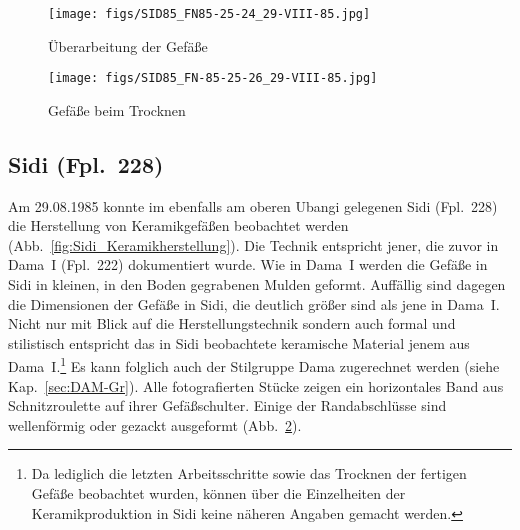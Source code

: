\begin{figure*}[tb]
	\centering
	\begin{subfigure}{0.49\textwidth} %
		\centering
		\texttt{[image: figs/SID85\_FN85-25-24\_29-VIII-85.jpg]}
		\caption{Überarbeitung der Gefäße}
		\label{fig:Sidi_KeramikherstellungA}
	\end{subfigure}
	\begin{subfigure}{0.49\textwidth} %
		\centering
		\texttt{[image: figs/SID85\_FN-85-25-26\_29-VIII-85.jpg]}
		\caption{Gefäße beim Trocknen}
		\label{fig:Sidi_KeramikherstellungB}
	\end{subfigure}
	\caption{Sidi (Fpl.~228): rezente Keramikproduktion (Fotos: F.~Nikulka).}
	\label{fig:Sidi_Keramikherstellung}
\end{figure*}

\subsection*{Sidi (Fpl.~228)}

Am 29.08.1985 konnte im ebenfalls am oberen Ubangi gelegenen Sidi (Fpl.~228) die Herstellung von Keramikgefäßen beobachtet werden (Abb.~\ref{fig:Sidi_Keramikherstellung}). Die Technik entspricht jener, die zuvor in Dama~I (Fpl.~222) dokumentiert wurde. Wie in Dama~I werden die Gefäße in Sidi in kleinen, in den Boden gegrabenen Mulden geformt. Auffällig sind dagegen die Dimensionen der Gefäße in Sidi, die deutlich größer sind als jene in Dama~I. Nicht nur mit Blick auf die Herstellungstechnik sondern auch formal und stilistisch entspricht das in Sidi beobachtete keramische Material jenem aus Dama~I.\footnote{Da lediglich die letzten Arbeitsschritte sowie das Trocknen der fertigen Gefäße beobachtet wurden, können über die Einzelheiten der Keramikproduktion in Sidi keine näheren Angaben gemacht werden.} Es kann folglich auch der Stilgruppe Dama zugerechnet werden (siehe Kap.~\ref{sec:DAM-Gr}). Alle fotografierten Stücke zeigen ein horizontales Band aus Schnitzroulette auf ihrer Gefäßschulter. Einige der Randabschlüsse sind wellenförmig oder gezackt ausgeformt (Abb.~\ref{fig:Sidi_KeramikherstellungB}).


